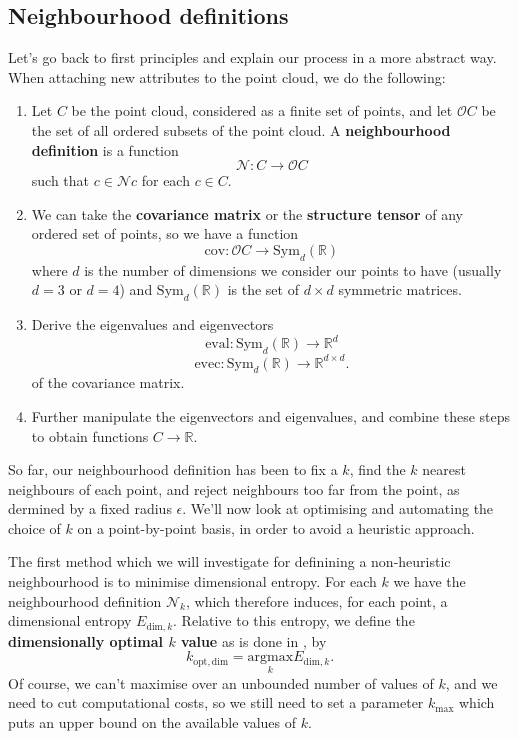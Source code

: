 \documentclass[a4paper,11pt,twoside]{article}
\theoremstyle{definition}
\theoremstyle{remark}
\begin{document}
\subsection{Neighbourhood definitions}
Let's go back to first principles and explain our process in a more abstract way. When attaching new attributes to the point cloud, we do the following:
\begin{enumerate}
\item Let $C$ be the point cloud, considered as a finite set of points, and let $\mathscr{O}C$ be the set of all ordered subsets of the point cloud. A \textbf{neighbourhood definition} is a function
\begin{displaymath}
\mathscr{N}:C\to\mathscr{O}C
\end{displaymath}
such that $c\in \mathscr{N}c$ for each $c\in C$.
\item We can take the \textbf{covariance matrix} or the \textbf{structure tensor} of any ordered set of points, so we have a function
\begin{displaymath}
\mathrm{cov}:\mathscr{O}C\to \mathrm{Sym}_d(\mathbb{R})
\end{displaymath}
where $d$ is the number of dimensions we consider our points to have (usually $d=3$ or $d=4$) and $\mathrm{Sym}_d(\mathbb{R})$ is the set of $d\times d$ symmetric matrices.
\item Derive the eigenvalues and eigenvectors
\begin{displaymath}
\mathrm{eval}:\mathrm{Sym}_d(\mathbb{R})\to \mathbb{R}^{d}
\end{displaymath}
\begin{displaymath}
\mathrm{evec}:\mathrm{Sym}_d(\mathbb{R})\to \mathbb{R}^{d\times d}.
\end{displaymath}
of the covariance matrix.
\item Further manipulate the eigenvectors and eigenvalues, and combine these steps to obtain functions $C\to\mathbb{R}$.
\end{enumerate}
So far, our neighbourhood definition has been to fix a $k$, find the $k$ nearest neighbours of each point, and reject neighbours too far from the point, as dermined by a fixed radius $\epsilon$. We'll now look at optimising and automating the choice of $k$ on a point-by-point basis, in order to avoid a heuristic approach.

The first method which we will investigate for definining a non-heuristic neighbourhood is to minimise dimensional entropy. For each $k$ we have the neighbourhood definition $\mathscr{N}_k$, which therefore induces, for each point, a dimensional entropy $E_{\mathrm{dim},k}$. Relative to this entropy, we define the \textbf{dimensionally optimal $k$ value} as is done in \cite[Section 6.3]{weinmann}, by
\begin{displaymath}
k_\mathrm{opt,dim}=\underset{k}{\mathrm{argmax}}E_{\mathrm{dim},k}.
\end{displaymath}
Of course, we can't maximise over an unbounded number of values of $k$, and we need to cut computational costs, so we still need to set a parameter $k_\mathrm{max}$ which puts an upper bound on the available values of $k$.
\end{document}
